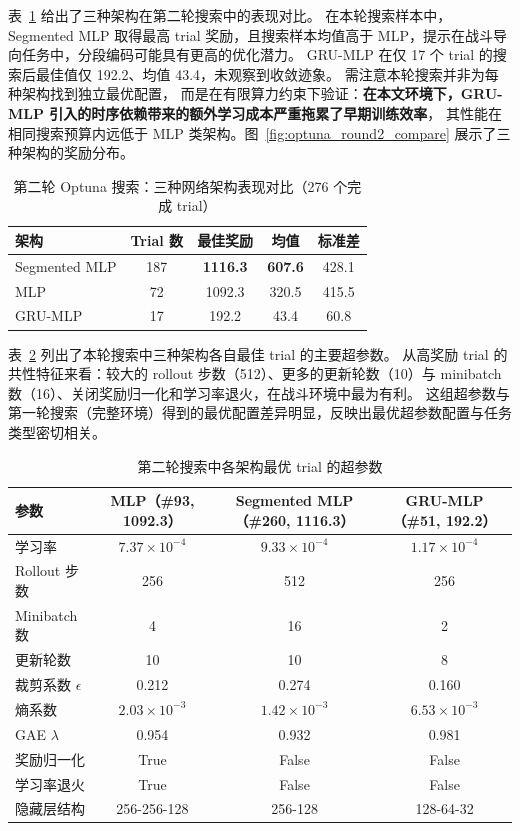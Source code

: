 \documentclass[12pt, a4paper, UTF8]{ctexart}
\numberwithin{equation}{section}
\begin{document}
表~\ref{tab:optuna_round2} 给出了三种架构在第二轮搜索中的表现对比。
在本轮搜索样本中，Segmented MLP 取得最高 trial 奖励，且搜索样本均值高于 MLP，提示在战斗导向任务中，分段编码可能具有更高的优化潜力。
GRU-MLP 在仅 17 个 trial 的搜索后最佳值仅 192.2、均值 43.4，未观察到收敛迹象。
需注意本轮搜索并非为每种架构找到独立最优配置，
而是在有限算力约束下验证：\textbf{在本文环境下，GRU-MLP 引入的时序依赖带来的额外学习成本严重拖累了早期训练效率}，
其性能在相同搜索预算内远低于 MLP 类架构。图~\ref{fig:optuna_round2_compare} 展示了三种架构的奖励分布。

\begin{table}[htbp]
  \centering
  \caption{ 第二轮 Optuna 搜索：三种网络架构表现对比（276 个完成 trial）}
  \label{tab:optuna_round2}
  \begin{tabular}{lcccc}
    \toprule
    架构 & Trial 数 & 最佳奖励 & 均值 & 标准差 \\
    \midrule
    Segmented MLP & 187 & \textbf{1116.3} & \textbf{607.6} & 428.1 \\
    MLP            & 72  & 1092.3 & 320.5 & 415.5 \\
    GRU-MLP        & 17  & 192.2  & 43.4  & 60.8  \\
    \bottomrule
  \end{tabular}
\end{table}

表~\ref{tab:optuna_round2_best} 列出了本轮搜索中三种架构各自最佳 trial 的主要超参数。
从高奖励 trial 的共性特征来看：较大的 rollout 步数（512）、更多的更新轮数（10）与 minibatch 数（16）、关闭奖励归一化和学习率退火，在战斗环境中最为有利。
这组超参数与第一轮搜索（完整环境）得到的最优配置差异明显，反映出最优超参数配置与任务类型密切相关。

\begin{table}[htbp]
  \centering
  \caption{ 第二轮搜索中各架构最优 trial 的超参数}
  \label{tab:optuna_round2_best}
  \setlength{\tabcolsep}{4pt}
  \begin{tabular}{lccc}
    \toprule
    参数 & MLP（\#93, 1092.3） & Segmented MLP（\#260, 1116.3） & GRU-MLP（\#51, 192.2） \\
    \midrule
    学习率                & $7.37\times10^{-4}$ & $9.33\times10^{-4}$ & $1.17\times10^{-4}$ \\
    Rollout 步数          & 256   & 512   & 256   \\
    Minibatch 数          & 4     & 16    & 2     \\
    更新轮数              & 10    & 10    & 8     \\
    裁剪系数 $\epsilon$   & 0.212 & 0.274 & 0.160 \\
    熵系数                & $2.03\times10^{-3}$ & $1.42\times10^{-3}$ & $6.53\times10^{-3}$ \\
    GAE $\lambda$         & 0.954 & 0.932 & 0.981 \\
    奖励归一化            & True  & False & False \\
    学习率退火            & True  & False & False \\
    隐藏层结构            & 256-256-128 & 256-128 & 128-64-32 \\
    \bottomrule
  \end{tabular}
\end{table}
\end{document}
